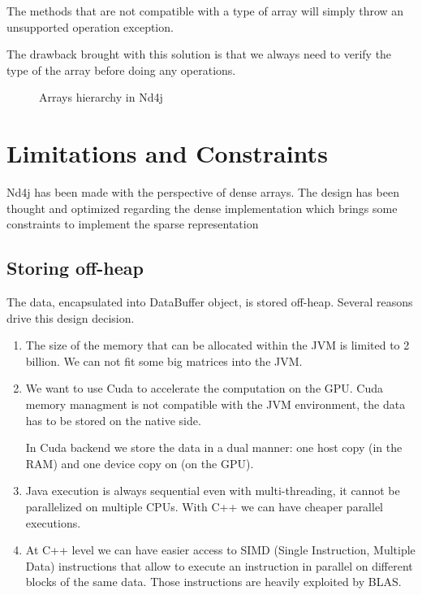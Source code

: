The methods that are not compatible with a type of array will simply throw an unsupported operation exception.

The drawback brought with this solution is that we always need to verify the type of the array before doing any operations.
 
\begin{figure}[H]
	\begin{center}
		\label{fig:hierarchy}
		\caption{Arrays hierarchy in Nd4j}
	\end{center}
\end{figure}


\section{Limitations and Constraints}

Nd4j has been made with the perspective of dense arrays. The design has been thought and optimized regarding the dense implementation which brings some constraints to implement the sparse representation
\subsection{Storing off-heap}

The data, encapsulated into DataBuffer object, is stored off-heap. Several reasons drive this design decision.
\begin{enumerate}
	\item The size of the memory that can be allocated within the JVM is limited to 2 billion. We can not fit some big matrices into the JVM.
	\item We want to use Cuda to accelerate the computation on the GPU. Cuda memory managment is not compatible with the JVM environment, the data has to be stored on the native side.
	
	In Cuda backend we store the data in a dual manner: one host copy (in the RAM) and one device copy on (on the GPU).
	
	\item Java execution is always sequential even with multi-threading, it cannot be parallelized on multiple CPUs. With C++ we can have cheaper parallel executions.
	\item At C++ level we can have easier access to SIMD (Single Instruction, Multiple Data) instructions that allow to execute an instruction in parallel on different blocks of the same data. Those instructions are heavily exploited by BLAS.
\end{enumerate}

